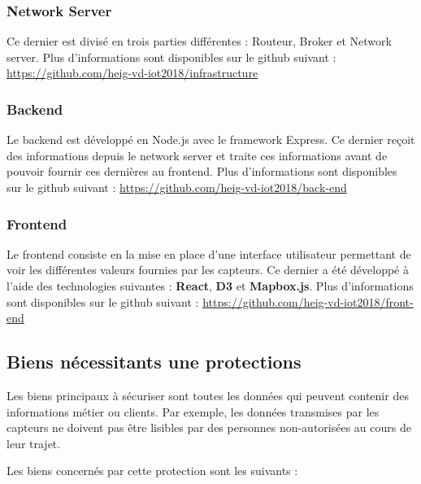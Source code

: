 \documentclass[12pt]{article}
\begin{document}
\subsubsection{Network Server}

Ce dernier est divisé en trois parties différentes : Routeur, Broker et Network server.
Plus d'informations sont disponibles sur le github suivant : \url{https://github.com/heig-vd-iot2018/infrastructure}
\subsubsection{Backend}

Le backend est développé en Node.js avec le framework Express. Ce dernier reçoit des informations depuis le network server et traite ces informations avant de pouvoir fournir ces dernières au frontend.
Plus d'informations sont disponibles sur le github suivant : \url{https://github.com/heig-vd-iot2018/back-end}

\subsubsection{Frontend}
Le frontend consiste en la mise en place d'une interface utilisateur permettant de voir les différentes valeurs fournies par les capteurs. Ce dernier a été développé à l'aide des technologies suivantes : \textbf{React}, \textbf{D3} et \textbf{Mapbox.js}.
Plus d'informations sont disponibles sur le github suivant : \url{https://github.com/heig-vd-iot2018/front-end}

\newpage
\subsection{Biens nécessitants une protections}

Les biens principaux à sécuriser sont toutes les données qui peuvent contenir des informations métier ou clients. Par exemple, les données transmises par les capteurs ne doivent pas être lisibles par des personnes non-autorisées au cours de leur trajet.

Les biens concernés par cette protection sont les suivants :
\end{document}
